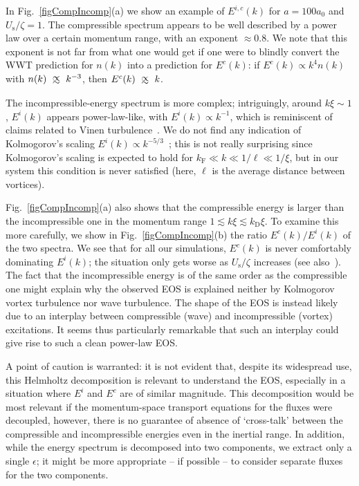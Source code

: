 \documentclass[prl,aps,twocolumn, a4paper,longbibliography,superscriptaddress]{revtex4-2}
\newcommand{\kD}{k_{\textrm{D}}}
\newcommand{\kF}{k_{\textrm{F}}}
\newcommand{\Us}{U_{\textrm{s}}}
\def\appropto{
  \def\p{
    \setbox0=\vbox{\hbox{$\propto$}}
    \ht0=0.6ex \box0 }
  \def\s{
    \vbox{\hbox{$\sim$}}
  }
  \mathrel{\raisebox{0.7ex}{
      \mbox{$\underset{\s}{\p}$}
    }}
}
\begin{document}
In Fig.~\ref{figCompIncomp}(a) we show an example of $E^{i,c}(k)$ for $a=100a_0$ and $\Us/\zeta=1$. The compressible spectrum appears to be well described by a power law over a certain momentum range, with an exponent $\approx 0.8$. We note that this exponent is not far from what one would get if one were to blindly convert the WWT prediction for $n(k)$ into a prediction for $E^c(k)$: if $E^c(k)\propto k^4n(k)$ with $n(k)\appropto k^{-3}$, then $E^c(k)\appropto k$.

The incompressible-energy spectrum is more complex; intriguingly, around  $k\xi\sim1$, $E^i(k)$ appears power-law-like, with $E^i(k)\propto k^{-1}$, which is reminiscent of claims related to Vinen turbulence~\cite{Cidrim:2017}. We do not find any indication of Kolmogorov's scaling $E^i(k)\propto k^{-5/3}$~\cite{Frisch:1995}; this is not really surprising since Kolmogorov's scaling is expected to hold for $\kF\ll k \ll 1/\ell\ll 1/\xi$, but in our system this condition is never satisfied (here, $\ell$ is the average distance between vortices).

Fig.~\ref{figCompIncomp}(a) also shows that the compressible energy is larger than the incompressible one in the momentum range $1\lesssim k\xi\lesssim\kD\xi$. To examine this more carefully, we show in Fig.~\ref{figCompIncomp}(b) the ratio $E^{c}(k)/E^{i}(k)$ of the two spectra.
We see that for all our simulations, $E^c(k)$ is never comfortably dominating $E^{i}(k)$; the situation only gets worse as $\Us/\zeta$ increases (see also~\cite{Fischer:2024}). The fact that the incompressible energy is of the same order as the compressible one might explain why the observed EOS is explained neither by Kolmogorov vortex turbulence nor wave turbulence.
The shape of the EOS is instead likely due to an interplay between compressible (wave) and incompressible (vortex) excitations. It seems thus particularly remarkable that such an interplay could give rise to such a clean power-law EOS.

A point of caution is warranted: it is not evident that, despite its widespread use, this Helmholtz decomposition is relevant to understand the EOS, especially in a situation where $E^i$ and $E^c$ are of similar magnitude.
This decomposition would be most relevant if the momentum-space transport equations for the fluxes were decoupled, however, there is no guarantee of absence of `cross-talk' between the compressible and incompressible energies even in the inertial range.
In addition, while the energy spectrum is decomposed into two components, we extract only a single $\epsilon$; it might be more appropriate -- if possible -- to consider separate fluxes for the two components.
\end{document}
